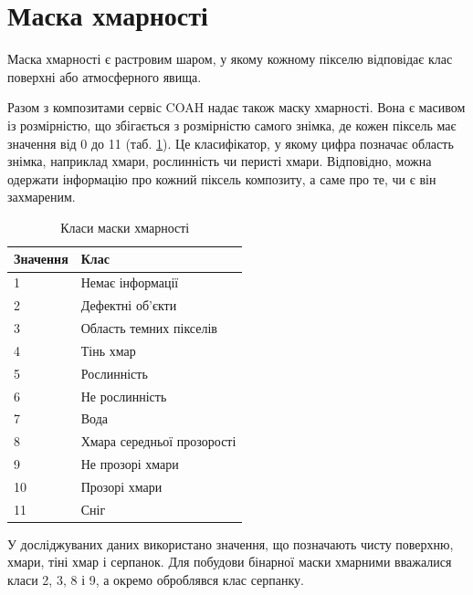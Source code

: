 \section{Маска хмарності}

Маска хмарності є растровим шаром, у якому %
кожному пікселю відповідає клас поверхні або
атмосферного явища.


Разом з композитами сервіс COAH надає також маску хмарності.
Вона є масивом із розмірністю, що збігається з розмірністю самого знімка,
де кожен піксель має значення від 0 до 11 (таб. \ref{tab:cloud-classes}).
Це класифікатор, у якому цифра позначає область знімка, наприклад хмари,
рослинність чи перисті хмари. Відповідно, можна одержати інформацію
про кожний піксель композиту, а саме про те, чи є він захмареним.

\begin{table}[H]
    \begin{center}
        \caption{Класи маски хмарності}
        \label{tab:cloud-classes}
        \begin{tabular}{|p{1.5in} | p{2.3in} |}
            \hline
            \textbf{Значення} & \textbf{Клас} \\
            \hline
            1             &  Немає інформації           \\
            2             &  Дефектні об’єкти           \\
            3             &  Область темних пікселів    \\
            4             &  Тінь хмар                  \\
            5             &  Рослинність                \\
            6             &  Не рослинність             \\
            7             &  Вода                       \\
            8             &  Хмара середньої прозорості \\
            9             &  Не прозорі хмари           \\
            10            &  Прозорі хмари              \\
            11            &  Сніг                       \\
            \hline
        \end{tabular}
    \end{center}
\end{table}

У досліджуваних даних %
використано значення, що позначають чисту
поверхню, хмари, тіні хмар і серпанок.  Для %
побудови бінарної маски хмарними вважалися
класи 2, 3, 8 і 9, а окремо оброблявся клас серпанку.

